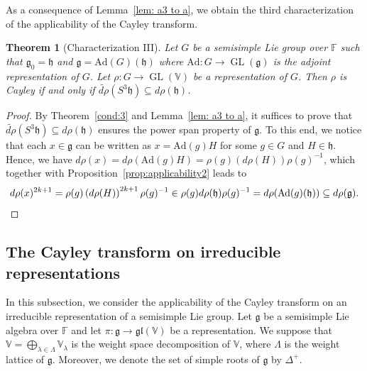 \documentclass[11pt,reqno]{amsart}
\DeclareMathOperator{\GL}{GL}
\newtheorem{theorem}{Theorem}[section]
\newcommand{\FF}{\mathbb{F}} %
\newcommand{\Ad}{\mathrm{Ad}}
\begin{document}
As a consequence of Lemma~\ref{lem: a3 to a},  we obtain the third characterization of the applicability of the Cayley transform.  
\begin{theorem}[Characterization III]\label{cond:simple}
Let $G$ be a semisimple Lie group over $\mathbb{F}$ such that $\mathfrak{g}_0 = \mathfrak{h}$ and $\mathfrak{g} = \Ad(G) (\mathfrak{h})$ where $\Ad: G \to \GL(\mathfrak{g})$ is the adjoint representation of $G$.  Let $\rho: G \to \GL(\mathbb{V})$ be a representation of $G$.  Then $\rho$ is Cayley if and only if $ \widetilde{d \rho}\left( S^3 \mathfrak{h} \right) \subseteq d \rho (\mathfrak{h})$. 
\end{theorem}
\begin{proof}
By Theorem~\ref{cond:3} and Lemma~\ref{lem: a3 to a},  it suffices to prove that $\widetilde{d \rho}\left( S^3 \mathfrak{h} \right) \subseteq d \rho (\mathfrak{h})$ ensures the power span property of $\mathfrak{g}$.  To this end,  we notice that each $x \in \mathfrak{g}$ can be written as $x = \Ad(g) H$ for some $g\in G$ and $H \in \mathfrak{h}$.  Hence,  we have $d\rho(x) = d \rho ( \Ad(g) H ) = \rho(g) \left( d \rho(H) \right) \rho(g)^{-1}$,  which together with Proposition~\ref{prop:applicability2} leads to
\[
d\rho(x)^{2k+1} = \rho(g) \left( d \rho(H) \right)^{2k+1} \rho(g)^{-1} \in \rho(g) d \rho(\mathfrak{h}) \rho(g)^{-1} = d\rho (\Ad(g)(\mathfrak{h})) \subseteq d\rho (\mathfrak{g}).  \qedhere
\]
\end{proof}
\subsection{The Cayley transform on irreducible representations} 
In this subsection,  we  consider the applicability of the Cayley transform on an irreducible representation of a semisimple Lie group.  Let $\mathfrak{g}$ be a semisimple Lie algebra over $\FF$ and let $\pi: \mathfrak{g} \to \mathfrak{gl}(\mathbb{V})$ be a representation.  We suppose that $\mathbb{V}=\bigoplus_{\lambda \in \Lambda}\mathbb{V}_\lambda$ is the weight space decomposition of $\mathbb{V}$,  where $\Lambda$ is the weight lattice of $\mathfrak{g}$.  Moreover,  we denote the set of simple roots of $\mathfrak{g}$ by $\Delta^+$.  
\end{document}
